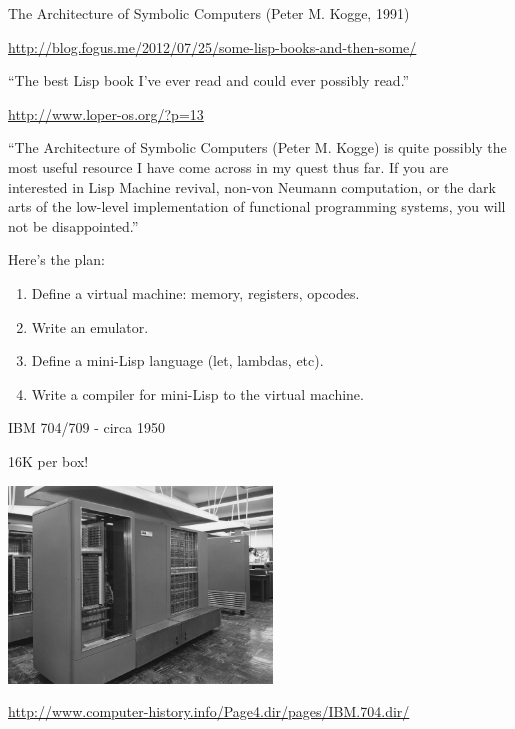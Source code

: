 \documentclass[professionalFonts]{beamer}
\begin{document}
\begin{frame}

The Architecture of Symbolic Computers (Peter M. Kogge, 1991)
\vspace{\baselineskip}

{\small \url{http://blog.fogus.me/2012/07/25/some-lisp-books-and-then-some/}}
\vspace{\baselineskip}

``The best Lisp book I've ever read and could ever possibly read.''
\vspace{\baselineskip}

\url{http://www.loper-os.org/?p=13}
\vspace{\baselineskip}

``The Architecture of Symbolic Computers (Peter M. Kogge) is quite
possibly the most useful resource I have come across in my quest thus
far. If you are interested in Lisp Machine revival, non-von Neumann
computation, or the dark arts of the low-level implementation of
functional programming systems, you will not be disappointed.''


\end{frame}




\begin{frame}

Here's the plan:

\begin{enumerate}

\item Define a virtual machine: memory, registers, opcodes.
\item Write an emulator.
\item Define a mini-Lisp language (let, lambdas, etc).
\item Write a compiler for mini-Lisp to the virtual machine.
\end{enumerate}

\end{frame}


\begin{frame}{IBM 704/709 - circa 1950}

16K per box!

\begin{center}
\includegraphics[width=7cm]{IBM704a.jpg}
\end{center}

{\small \url{http://www.computer-history.info/Page4.dir/pages/IBM.704.dir/}}

\end{frame}
\end{document}
